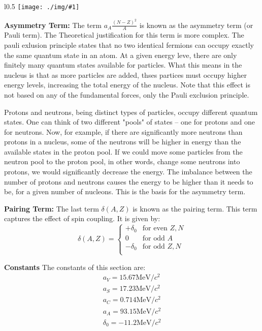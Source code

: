 \documentclass[10pt,a4paper]{article}
\newcounter{figurecounter}
\newcommand{\imgl}[3]{
    \begin{wrapfigure}{l}{#2\textwidth}
        \centering
        \captionsetup{justification=centering,margin=0cm,labelformat=empty}
        \texttt{[image: ./img/\#1]}
        \label{figure}
        \caption{\small \textbf{fig: \thefigurecounter} -- \textcolor{darkliver}{#3}}
    \end{wrapfigure}
    \addtocounter{figurecounter}{1}}
\newcommand{\mev}{\text{MeV}}
\begin{document}
\imgl{asymmetry}{0.5}{Asymmetry Term}
\textbf{Asymmetry Term:} The term $a_A\frac{(N-Z)^2}{A}$ is known as the asymmetry term (or Pauli term). The Theoretical justification for this term is more complex. The pauli exlusion principle states that no two identical fermions can occupy exactly the same quantum state in an atom. At a given energy leve, there are only finitely many quantum states available for particles. What this means in the nucleus is that as more particles are added, thses partices must occupy higher energy levels, increasing the total energy of the nucleus. Note that this effect is not based on any of the fundamental forces, only the Pauli exclusion principle. 

Protons and neutrons, being distinct types of particles, occupy different quantum states. One can think of two different "pools" of states – one for protons and one for neutrons. Now, for example, if there are significantly more neutrons than protons in a nucleus, some of the neutrons will be higher in energy than the available states in the proton pool. If we could move some particles from the neutron pool to the proton pool, in other words, change some neutrons into protons, we would significantly decrease the energy. The imbalance between the number of protons and neutrons causes the energy to be higher than it needs to be, for a given number of nucleons. This is the basis for the asymmetry term.


\textbf{Pairing Term:} The last term $\delta(A,Z)$ is known as the pairing term. This term captures the effect of spin coupling. It is given by:
\begin{equation}
    \delta(A,Z) =\left\{ 
    \begin{array}{ll}
        +\delta_0 & \text{for even } Z, N\\
        0 & \text{for odd } A\\
        -\delta_0 & \text{for odd } Z, N\\
    \end{array}\right.
\end{equation}

\textbf{Constants}
The constants of this section are:
\begin{align*}
    a_V = 15.67\mev/c^2\\
    a_S = 17.23\mev/c^2\\
    a_C = 0.714\mev/c^2\\
    a_A = 93.15\mev/c^2\\
    \delta_0 = -11.2\mev/c^2
\end{align*}
\end{document}
